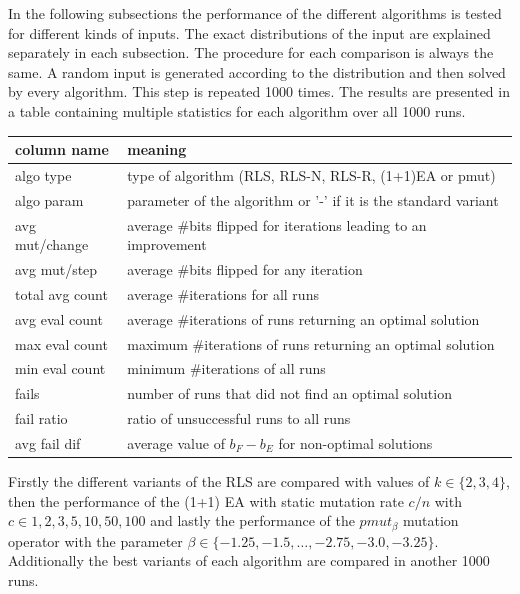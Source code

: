 In the following subsections the performance of the different algorithms is tested for different kinds of inputs.
The exact distributions of the input are explained separately in each subsection.
The procedure for each comparison is always the same. A random input is generated according to the distribution and then solved by every algorithm. This step is repeated 1000 times.
The results are presented in a table containing multiple statistics for each algorithm over all 1000 runs.

\begin{tabular}{m{3cm} | m{15cm}}
      column name     & meaning                                                         \\ \hline
      algo type       & type of algorithm (RLS, RLS-N, RLS-R, (1+1)EA or pmut)          \\
      algo param      & parameter of the algorithm or '-' if it is the standard variant \\
      avg mut/change  & average \#bits flipped for iterations leading to an improvement \\
      avg mut/step    & average \#bits flipped for any iteration                        \\
      total avg count & average \#iterations for all runs                               \\
      avg eval count  & average \#iterations of runs returning an optimal solution      \\
      max eval count  & maximum \#iterations of runs returning an optimal solution      \\
      min eval count  & minimum \#iterations of all runs                                \\
      fails           & number of runs that did not find an optimal solution            \\
      fail ratio      & ratio of unsuccessful runs to all runs                          \\
      avg fail dif    & average value of $b_F-b_E$ for non-optimal solutions            \\
\end{tabular}

Firstly the different variants of the RLS are compared with values of $k \in\{2,3,4\}$, then the performance of the (1+1) EA with static mutation rate $c/n$ with $c \in{1,2,3,5,10,50,100}$ and lastly the performance of the $pmut_\beta$ mutation operator with the parameter $\beta \in \{-1.25, -1.5, \dots, -2.75,-3.0,-3.25\}$. Additionally the best variants of each algorithm are compared in another 1000 runs.


